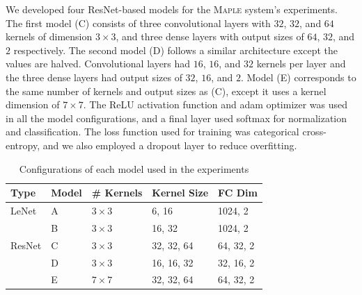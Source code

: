 We developed four ResNet-based models for the \textsc{Maple} system's experiments. The first model (C) consists of three convolutional layers with $32$, $32$, and $64$ kernels of dimension $3\times3$, and three dense layers with output sizes of $64$, $32$, and $2$ respectively. The second model (D) follows a similar architecture except the values are halved. Convolutional layers had $16$, $16$, and $32$ kernels per layer and the three dense layers had output sizes of $32$, $16$, and $2$. Model (E) corresponds to the same number of kernels and output sizes as (C), except it uses a kernel dimension of $7\times7$. The ReLU activation function and adam optimizer was used in all the model configurations, and a final layer used softmax for normalization and classification. The loss function used for training was categorical cross-entropy, and we also employed a dropout layer to reduce overfitting.

\begin{table} [h!]
\centering
\begin{tabular}{| l | l | l | l | l |}
\hline
Type & Model & \# Kernels & Kernel Size & FC Dim \\
\hline
LeNet & A & $3\times3$ & 6, 16 & 1024, 2 \\
\cline{2-5}
& B & $3\times3$ & 16, 32 & 1024, 2 \\
\hline
ResNet & C & $3\times3$ & 32, 32, 64 & 64, 32, 2 \\
\cline{2-5}
& D & $3\times3$ & 16, 16, 32 & 32, 16, 2 \\
\cline{2-5}
& E & $7\times7$ & 32, 32, 64 & 64, 32, 2 \\
\cline{2-5}
\hline
\end{tabular}
\caption{Configurations of each model used in the experiments}
\label{table:attacks}
\end{table}
